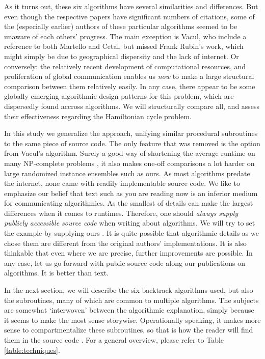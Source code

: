 \documentclass[10pt,conference,compsocconf]{IEEEtran}
\begin{document}
As it turns out, these six algorithms have several similarities and differences. But even though the respective papers have significant numbers of citations, some of the (especially earlier) authors of these particular algorithms seemed to be unaware of each others' progress. The main exception is Vacul, who include a reference to both Martello and Cetal, but missed Frank Rubin's work, which might simply be due to geographical dispersity and the lack of internet. Or conversely: the relatively recent development of computational resources, and  proliferation of global communication enables us \textit{now} to make a large structural comparison between them relatively easily. In any case, there appear to be some globally emerging algorithmic design patterns for this problem, which are dispersedly found accross algorithms. We will structurally compare all, and assess their effectiveness regarding the Hamiltonian cycle problem. 

In this study we generalize the approach, unifying similar procedural subroutines to the same piece of source code. The only feature that was removed is the  option from Vacul's algorithm. Surely a good way of shortening the average runtime on many NP-complete problems \cite{gomes1999fine}, it also makes one-off comparisons a lot harder on large randomized instance ensembles such as ours. As most algorithms predate the internet, none came with readily implementable source code. We like to emphasize our belief that text such as you are reading now is an inferior medium for communicating algorithmics. As the smallest of details can make the largest differences when it comes to runtimes. Therefore, one should \textit{always supply publicly accessible source code} when writing about algorithms. We will try to set the example by supplying ours \cite{sourcecodejoeri}. It is quite possible that algorithmic details as we chose them are different from the original authors' implementations. It is also thinkable that even where we are precise,  further improvements are possible. In any case, let us go forward with public source code along our publications on algorithms. It is better than text.

In the next section, we will describe the six backtrack algorithms used, but also the subroutines, many of which are common to multiple algorithms. The subjects are somewhat `interwoven' between the algorithmic explanation, simply because it seems to make the most sense storywise. Operationally speaking, it makes more sense to compartmentalize these subroutines, so that is how the reader will find them in the source code \cite{sourcecodejoeri}. For a general overview, please refer to Table \ref{table:techniques}.
\end{document}
